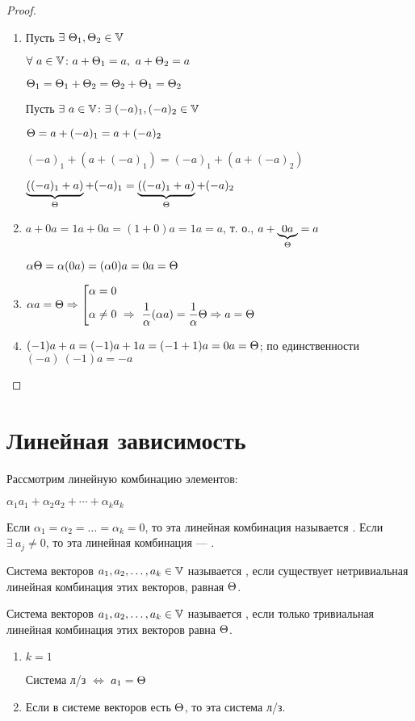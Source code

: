 \begin{proof}
\begin{enumerate}
\item Пусть $\exists\ \T_1,\T_2\in\V$

$\forall\ a\in\V\colon{}a+\T_1=a,\ a+\T_2=a$

$\Theta_1=\Theta_1+\Theta_2=\Theta_2+\Theta_1=\Theta_2$

Пусть $\exists\ a\in\V\colon\exists\ (-a)_1,(-a)_2\in\V$

$\Theta=a+(-a)_1=a+(-a)_2$

$(-a)_1+(a+(-a)_1)=(-a)_1+(a+(-a)_2)$

$\underbrace{((-a)_1+a)}_{\scriptsize\Theta}+(-a)_1=\underbrace{((-a)_1+a)}_{\scriptsize\Theta}+(-a)_2$

\item $a+0a=1a+0a=(1+0)a=1a=a$, т. о., $a+\underbrace{0a}_{\scriptsize\Theta}=a$

$\alpha\Theta=\alpha(0a)=(\alpha0)a=0a=\Theta$

\item $\alpha{}a=\T\Rightarrow\left[\begin{aligned}
& \alpha=0 \\
& \alpha\neq0\ \Rightarrow\ \frac1\alpha(\alpha{}a)=\frac1\alpha\T\Rightarrow a=\T
\end{aligned}\right.$
\item $(-1)a+a=(-1)a+1a=(-1+1)a=0a=\Theta$; по единственности $(-a)\ (-1)a=-a$
\end{enumerate}
\end{proof}
\chapter{Линейная зависимость}
\begin{opred}
Рассмотрим линейную комбинацию элементов:

$\alpha_1a_1+\alpha_2a_2+\cdots+\alpha_ka_k$

Если $\alpha_1=\alpha_2=\ldots=\alpha_k=0$, то эта линейная комбинация называется . Если $\exists\ a_j\neq0$, то эта линейная комбинация --- .
\end{opred}
\begin{opred}
Система векторов $a_1,a_2,\ldots,a_k\in\mathbb{V}$ называется , если существует нетривиальная линейная комбинация этих векторов, равная $\Theta$.
\end{opred}
\begin{opred}
Система векторов $a_1,a_2,\ldots,a_k\in\mathbb{V}$ называется , если только тривиальная линейная комбинация этих векторов равна $\Theta$.
\end{opred}
\begin{remark}
\begin{enumerate}
\item $k=1$

Система л/з $\Leftrightarrow$ $a_1=\Theta$
\item Если в системе векторов есть $\Theta$, то эта система л/з.
\end{enumerate}
\end{remark}
